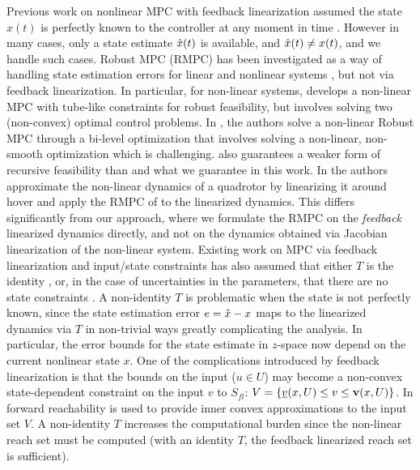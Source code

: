 Previous work on nonlinear MPC with feedback linearization assumed the state $x(t)$ is perfectly known to the controller at any moment in time \cite{SimonLG13_MPC}.
However in many cases, only a state estimate $\hat{x}(t)$ is available, and $\hat{x}(t) \neq x(t)$, and we handle such cases.
Robust MPC (RMPC) has been investigated as a way of handling state estimation errors for linear \cite{RichardsH05_RMPC} and nonlinear systems \cite{tube,relaxed}, but not via feedback linearization. 
In particular, for non-linear systems, \cite{tube} develops a non-linear MPC with tube-like constraints for robust feasibility, but involves solving two (non-convex) optimal control problems. 
In \cite{relaxed}, the authors solve a non-linear Robust MPC through a bi-level optimization that involves solving a non-linear, non-smooth optimization which is challenging. 
\cite{relaxed} also guarantees a weaker form of recursive feasibility than \cite{RichardsH05_RMPC} and what we guarantee in this work. 
In \cite{Zhao20141335} the authors approximate the non-linear dynamics of a quadrotor by linearizing it around hover and apply the RMPC of \cite{RichardsH05_RMPC} to the linearized dynamics.
This differs significantly from our approach, where we formulate the RMPC on the \emph{feedback} linearized dynamics directly, and not on the dynamics obtained via Jacobian linearization of the non-linear system.
Existing work on MPC via feedback linearization and input/state constraints has also assumed that either $T$ is the identity \cite{SimonLG13_MPC}, 
or, in the case of uncertainties in the parameters, that there are no state constraints \cite{parameter}.
A non-identity $T$ is problematic when the state is not perfectly known, since the state estimation error $e = \hat{x}-x$ maps to the linearized dynamics via $T$ in non-trivial ways greatly complicating the analysis.
In particular, the error bounds for the state estimate in $z$-space now depend on the current nonlinear state $x$.
One of the complications introduced by feedback linearization is that the bounds on the input ($u \in U$) may become a non-convex state-dependent constraint on the input $v$ to $S_{fl}$: 
$V = \{\underline{v}(x, U) \leq v \leq \mathbf{v}(x,U)\}$.
In \cite{SimonLG13_MPC} forward reachability is used to provide inner convex approximations to the input set $V$.
A non-identity $T$ increases the computational burden since the non-linear reach set must be computed (with an identity $T$, the feedback linearized reach set is sufficient).

